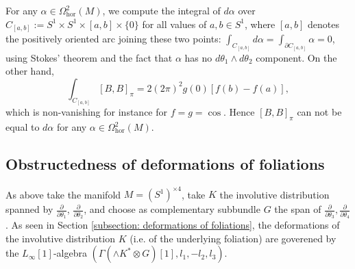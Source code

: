 \documentclass[11pt,thmsa]{amsart}
\theoremstyle{definition}
\newcommand{\hor}{\mathrm{hor}}
\begin{document}
For any $\alpha \in \Omega^2_\hor(M)$, we compute the   integral of $d\alpha$
over $C_{[a,b]}:={S^1\times S^1\times [a,b] \times \{0\}}$ for all values of $a,b\in S^1$, where $[a,b]$ denotes the positively oriented arc joining these two points:
$\int_{C_{[a,b]}}d\alpha=
\int_{\partial C_{[a,b]}}\alpha=0$,
using Stokes' theorem and the fact that $\alpha$ has no $d\theta_1\wedge d\theta_2$ component.
On the other hand, $$ \int_{C_{[a,b]}}[B,B]_{\pi}= 2(2\pi)^2g(0)[f(b)-f(a)],$$ which is non-vanishing for instance for $f=g=\cos$. Hence $[B,B]_{\pi}$ can not be equal to $d\alpha$ for any $\alpha \in \Omega^2_\hor(M)$. 
  



\subsection{Obstructedness of deformations of foliations}
As above take the manifold $M=(S^1)^{\times 4}$, take $K$ the involutive distribution  spanned by $\frac{\partial}{\partial \theta_1}$, $\frac{\partial}{\partial \theta_2}$, and choose
as complementary subbundle $G$  the span of
$\frac{\partial}{\partial \theta_3},\frac{\partial}{\partial \theta_4}$. 
As seen in Section \ref{subsection: deformations of foliations}, the deformations of the involutive distribution $K$ (i.e. of the underlying foliation) are goverened by the 
 $L_{\infty}[1]$-algebra 
 $(\Gamma(\wedge K^*\otimes G)[1],l_1,-l_2,l_3)$. 
 
\end{document}
